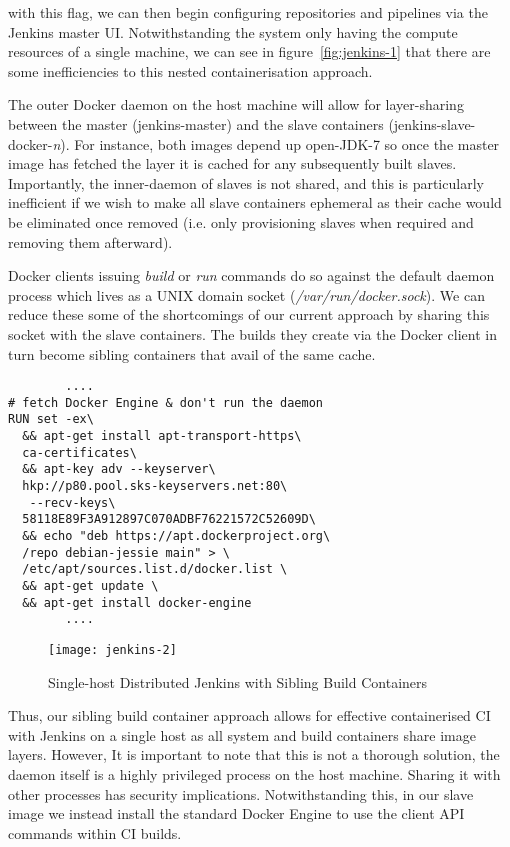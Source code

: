 \documentclass[journal]{IEEEtran}
\begin{document}
with this flag, we can then begin configuring repositories and pipelines via the
Jenkins master UI. Notwithstanding the system only having the compute resources of a single machine, 
we can see in figure~\ref{fig:jenkins-1} that there are some inefficiencies to this nested containerisation
approach.
\par
The outer Docker daemon on the host machine will allow
for layer-sharing between the master (jenkins-master) and the slave
containers (jenkins-slave-docker-\textit{n}). For instance,
both images depend up open-JDK-7 so once the master image
has fetched the layer it is cached for any subsequently built slaves.
Importantly, the inner-daemon of slaves is not shared, and this is 
particularly inefficient if we wish to make all slave containers ephemeral as
their cache would be eliminated once removed (i.e. only provisioning slaves when required and removing them afterward). 
\par
Docker clients issuing \textit{build} or \textit{run} commands do so
against the default daemon process which lives as a UNIX domain socket 
(\textit{/var/run/docker.sock}). We can reduce these some of the 
shortcomings of our current approach by sharing this socket with the
slave containers. The builds they create via the Docker client in turn
become sibling containers that avail of the same cache.
\begin{verbatim}
  		....
# fetch Docker Engine & don't run the daemon
RUN set -ex\
  && apt-get install apt-transport-https\ 
  ca-certificates\
  && apt-key adv --keyserver\ 
  hkp://p80.pool.sks-keyservers.net:80\
   --recv-keys\
  58118E89F3A912897C070ADBF76221572C52609D\
  && echo "deb https://apt.dockerproject.org\
  /repo debian-jessie main" > \
  /etc/apt/sources.list.d/docker.list \
  && apt-get update \
  && apt-get install docker-engine
		....
\end{verbatim}	
\begin{figure}[htp]
      \centering
      \texttt{[image: jenkins-2]}
      \caption{Single-host Distributed Jenkins with Sibling Build Containers} 
      \label{fig:jenkins-2}
\end{figure}
Thus, our sibling build container approach allows for effective containerised CI with Jenkins on a single host
as all system and build containers share image layers. 
However, It is important to note that this is not a thorough solution,
the daemon itself is a highly privileged process on the host machine.
Sharing it with other processes has security implications.
Notwithstanding this, in our slave image we instead install the standard
Docker Engine to use the client API commands within CI builds.
\end{document}
